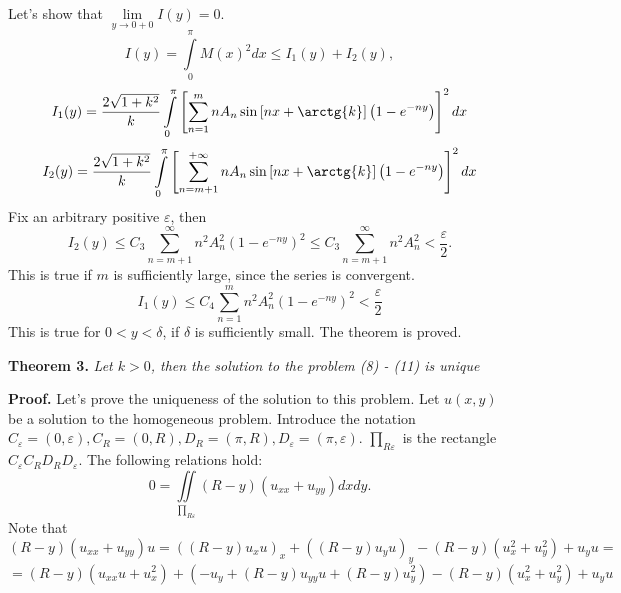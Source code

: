 \documentclass[9pt]{article}
\begin{document}
	Let's show that $\lim\limits_{y \to 0 + 0} I(y) = 0$.
	\begin{equation*}
		I(y)  = \int\limits_0^\pi M(x)^2 dx \leq I_1(y) + I_2(y),
	\end{equation*}
	\begin{equation*}
		I_1(y) = \dfrac{2\sqrt{1 + k^2}}{k} \int\limits_0^\pi\left[\sum\limits_{n=1}^{m} n A_n \sin{\left[nx + \arctg{k}\right]} \left(1 - e^{-ny}\right)\right]^2 dx
	\end{equation*}
	\begin{equation*}
		I_2(y) = \dfrac{2\sqrt{1 + k^2}}{k} \int\limits_0^\pi\left[\sum\limits_{n=m+1}^{+\infty} n A_n \sin{\left[nx + \arctg{k}\right]} \left(1 - e^{-ny}\right)\right]^2 dx
	\end{equation*}
	Fix an arbitrary positive $\varepsilon$, then
	\begin{equation*}
		I_2(y) \leq C_3 \sum\limits_{n=m+1}^{\infty} n^2 A_n^2 (1 - e^{-ny})^2 \leq C_3 \sum\limits_{n=m+1}^{\infty} n^2 A_n^2 < \dfrac{\varepsilon}{2}.
	\end{equation*}
	This is true if $m$ is sufficiently large, since the series is convergent.
	\begin{equation*}
		I_1(y) \leq C_4 \sum\limits_{n=1}^{m} n^2 A_n^2 (1 - e^{-ny})^2 < \dfrac{\varepsilon}{2}
	\end{equation*}
	This is true for $0 < y < \delta$, if $\delta$ is sufficiently small. The theorem is proved.
	\par
	\textbf{Theorem 3.} \textit{Let $k > 0$, then the solution to the problem (8) - (11) is unique}
	\par
	\textbf{Proof.} Let's prove the uniqueness of the solution to this problem. Let $u(x,y)$ be a solution to the homogeneous problem.
	Introduce the notation $C_\varepsilon = (0, \varepsilon), C_R = (0, R), D_R = (\pi, R), D_\varepsilon = (\pi, \varepsilon)$. $\prod_{R\varepsilon}$ is the rectangle $C_\varepsilon C_R D_R D_\varepsilon$. The following relations hold:
	\begin{equation*}
		0 = \iint\limits_{\prod_{R\varepsilon}} (R-y) (u_{xx} + u_{yy}) dx dy.
	\end{equation*}
	Note that
	\begin{equation*}
		(R - y) (u_{xx} + u_{yy}) u = \left( \left(R - y\right) u_x u\right)_x  + \left( \left(R - y\right) u_y u\right)_y - \left(R- y\right) \left(u_x^2 + u_y^2\right) +  u_y u =
	\end{equation*}
	\begin{equation*}
		= \left(R-y\right) \left(u_{xx} u + u_x^2\right) + \left(-u_y + \left(R-y\right) u_{yy} u + \left(R-y\right)u_y^2\right) - \left(R- y\right) \left(u_x^2 + u_y^2\right)+  u_y u
	\end{equation*}
\end{document}
